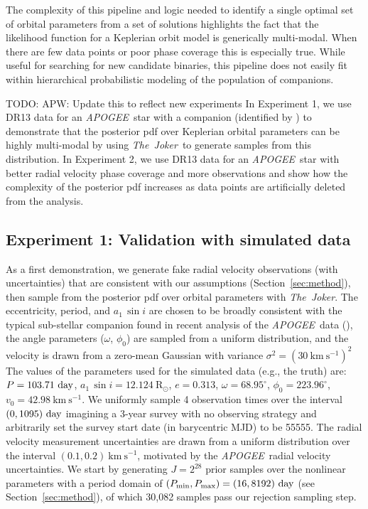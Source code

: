\documentclass[manuscript, letterpaper]{aastex6}
\newcommand{\project}[1]{\textsl{#1}}
\newcommand{\acronym}[1]{{\small{#1}}}
\newcommand{\apogee}{\project{\acronym{APOGEE}}}
\newcommand{\samplername}{\project{The~Joker}}
\newcommand{\sectionname}{Section}
\newcommand{\asini}{\ensuremath{a_1\,\sin i}}
\newcommand{\rsun}{\mathrm{R}_\odot}
\newcommand{\kms}{\mathrm{km}~\mathrm{s}^{-1}}
\newcommand{\todo}[1]{{\color{red}TODO: #1}}
\begin{document}
The complexity of this pipeline and logic needed to identify a single optimal
set of orbital parameters from a set of solutions highlights the fact that the
likelihood function for a Keplerian orbit model is generically multi-modal.
When there are few data points or poor phase coverage this is especially true.
While useful for searching for new candidate binaries, this pipeline does not
easily fit within hierarchical probabilistic modeling of the population of
companions.

\todo{APW: Update this to reflect new experiments}
In Experiment 1, we use DR13 data for an \apogee\ star with a companion
(identified by \citealt{Troup:2016}) to demonstrate that the posterior pdf over
Keplerian orbital parameters can be highly multi-modal by using \samplername\
to generate samples from this distribution.
In Experiment 2, we use DR13 data for an \apogee\ star with better radial
velocity phase coverage and more observations and show how the complexity of
the posterior pdf increases as data points are artificially deleted from the
analysis.

\subsection{Experiment 1: Validation with simulated data}

As a first demonstration, we generate fake radial velocity observations (with
uncertainties) that are consistent with our assumptions
(\sectionname~\ref{sec:method}), then sample from the posterior pdf over orbital
parameters with \samplername.
The eccentricity, period, and $\asini$ are chosen to be broadly consistent with
the typical sub-stellar companion found in recent analysis of the \apogee\ data
(\citealt{Troup:2016}), the angle parameters ($\omega$, $\phi_0$) are sampled
from a uniform distribution, and the velocity is drawn from a zero-mean Gaussian
with variance $\sigma^2 = (30~\kms)^2$
The values of the parameters used for the simulated data (e.g., the truth) are:
$P = 103.71~{\rm day}$, $\asini = 12.124~\rsun$, $e = 0.313$, $\omega =
68.95^\circ$, $\phi_0 = 223.96^\circ$, $v_0 = 42.98~\kms$.
We uniformly sample 4 observation times over the interval $(0,1095)~{\rm day}$
imagining a 3-year survey with no observing strategy and arbitrarily set the
survey start date (in barycentric MJD) to be 55555.
The radial velocity measurement uncertainties are drawn from a uniform
distribution over the interval $(0.1, 0.2)~\kms$, motivated by the \apogee\
radial velocity uncertainties.
We start by generating $J=2^{28}$ prior samples over the nonlinear parameters
with a period domain of $(P_{\rm min}, P_{\rm max}) = (16, 8192)~{\rm day}$ (see
\sectionname~\ref{sec:method}), of which 30,082 samples pass our rejection
sampling step.
\end{document}
